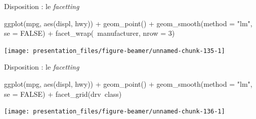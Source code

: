 \documentclass[12pt,handout,ignorenonframetext,]{beamer}
\newenvironment{Shaded}{}{}
\newcommand{\KeywordTok}[1]{\textcolor[rgb]{0.00,0.00,1.00}{#1}}
\newcommand{\DataTypeTok}[1]{#1}
\newcommand{\DecValTok}[1]{#1}
\newcommand{\StringTok}[1]{\textcolor[rgb]{0.00,0.50,0.50}{#1}}
\newcommand{\OtherTok}[1]{\textcolor[rgb]{1.00,0.25,0.00}{#1}}
\newcommand{\OperatorTok}[1]{#1}
\newcommand{\NormalTok}[1]{#1}
\renewenvironment{Shaded}{\begin{snugshade}}{\end{snugshade}}
\begin{document}
\begin{frame}[fragile]{Disposition : le \emph{facetting}}

\footnotesize \center

\begin{Shaded}
\begin{Highlighting}[]
\KeywordTok{ggplot}\NormalTok{(mpg, }\KeywordTok{aes}\NormalTok{(displ, hwy)) }\OperatorTok{+}
\StringTok{  }\KeywordTok{geom_point}\NormalTok{() }\OperatorTok{+}\StringTok{ }\KeywordTok{geom_smooth}\NormalTok{(}\DataTypeTok{method =} \StringTok{"lm"}\NormalTok{, }\DataTypeTok{se =} \OtherTok{FALSE}\NormalTok{) }\OperatorTok{+}\StringTok{ }
\StringTok{  }\KeywordTok{facet_wrap}\NormalTok{(}\OperatorTok{~}\NormalTok{manufacturer, }\DataTypeTok{nrow =} \DecValTok{3}\NormalTok{)}
\end{Highlighting}
\end{Shaded}

\texttt{[image: presentation\_files/figure-beamer/unnamed-chunk-135-1]}

\end{frame}

\begin{frame}[fragile]{Disposition : le \emph{facetting}}

\footnotesize \center

\begin{Shaded}
\begin{Highlighting}[]
\KeywordTok{ggplot}\NormalTok{(mpg, }\KeywordTok{aes}\NormalTok{(displ, hwy)) }\OperatorTok{+}
\StringTok{  }\KeywordTok{geom_point}\NormalTok{() }\OperatorTok{+}\StringTok{ }\KeywordTok{geom_smooth}\NormalTok{(}\DataTypeTok{method =} \StringTok{"lm"}\NormalTok{, }\DataTypeTok{se =} \OtherTok{FALSE}\NormalTok{) }\OperatorTok{+}\StringTok{ }
\StringTok{  }\KeywordTok{facet_grid}\NormalTok{(drv}\OperatorTok{~}\NormalTok{class)}
\end{Highlighting}
\end{Shaded}

\texttt{[image: presentation\_files/figure-beamer/unnamed-chunk-136-1]}

\end{frame}
\end{document}
